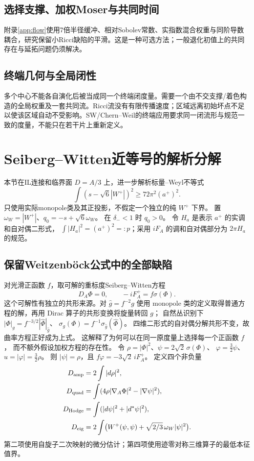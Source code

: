 \documentclass[UTF8,a4paper,11pt,fontset=fandol]{ctexart}
\numberwithin{equation}{section}
\theoremstyle{definition}
\begin{document}
\subsection{选择支撑、加权Moser与共同时间}
附录\ref{app:flow}使用7倍半径缓冲、相对Sobolev常数、实指数混合权重与同阶导数耦合，研究保留小Ricci缺陷的平滑。这是一种可选方法；一般退化初值上的共同存在与延拓问题仍须解决。

\subsection{终端几何与全局闭性}
多个中心不能各自演化后被当成同一个终端闭度量。需要一个由不交支撑/着色构造的全局权重及一套共同流。Ricci流没有有限传播速度；区域远离初始坏点不足以使该区域自动不受影响。SW/Chern--Weil的终端应用要求同一闭流形与规范一致的度量，不能只在若干片上重新定义。

\section{Seiberg--Witten近等号的解析分解}
本节在IL连接和临界面 $D=A/3$ 上，进一步解析标量--Weyl不等式
\begin{equation}\label{eq:primitiveSW}
\int(s-\sqrt6|W^+|)^2\ge72\pi^2(a^+)^2.
\end{equation}
只使用实际monopole类及其正投影，不假定一个独立的纯 $W^+$ 下界。
置 $\omega_W=|W^+|$、$q_0=-s+\sqrt6\omega_W$。
在 $\delta_-<1$ 时 $q_0>0$。
令 $H_a$ 是表示 $a^+$ 的实调和自对偶二形式，
$\int|H_a|^2=(a^+)^2=:p$；采用 $iF_A$ 的调和自对偶部分为 $2\pi H_a$ 的规范。

\subsection{保留Weitzenb\"ock公式中的全部缺陷}
对光滑正函数 $f$，取可解的重标度Seiberg--Witten方程
\[
D_A\Phi=0,\qquad -iF_A^+=f\sigma(\Phi).
\]
这个可解性有独立的共形来源。对 $\widehat g=f^{-2}g$ 使用 monopole
类的定义取得普通方程的解，再用 Dirac 算子的共形变换将旋量转回 $g$；
自然丛识别下 $|\Phi|_g=f^{-3/2}|\widehat\Phi|_{\widehat g}$、
$\sigma_g(\Phi)=f^{-1}\sigma_{\widehat g}(\widehat\Phi)$。
四维二形式的自对偶分解共形不变，故曲率方程正好成为上式。
这解释了为何可以在同一原度量上选择每一个正函数 $f$，
而不额外假设加权方程的存在性\cite[Lemma 3.7 and Proposition 3.8]{LeBrunConvex}。
令
$\rho=|\Phi|^2$、$\psi=2\sqrt2\,\sigma(\Phi)$、
$\varphi=\tfrac32\psi$、$u=|\varphi|=\tfrac32\rho$。
则 $|\psi|=\rho$，且 $f\varphi=-3\sqrt2\,iF_A^+$。
定义四个非负量
\begin{align*}
D_{\rm amp}&=2\int|d\rho|^2,\\
D_{\rm quad}&=\int(4\rho|\nabla_A\Phi|^2-|\nabla\psi|^2),\\
D_{\rm Hodge}&=\int(|d\psi|^2+|d^*\psi|^2),\\
D_{\rm eig}&=2\int\bigl(W^+(\psi,\psi)+\sqrt{2/3}\,\omega_W|\psi|^2\bigr).
\end{align*}
第二项使用自旋子二次映射的微分估计；第四项使用迹零对称三维算子的最低本征值界。
\end{document}
